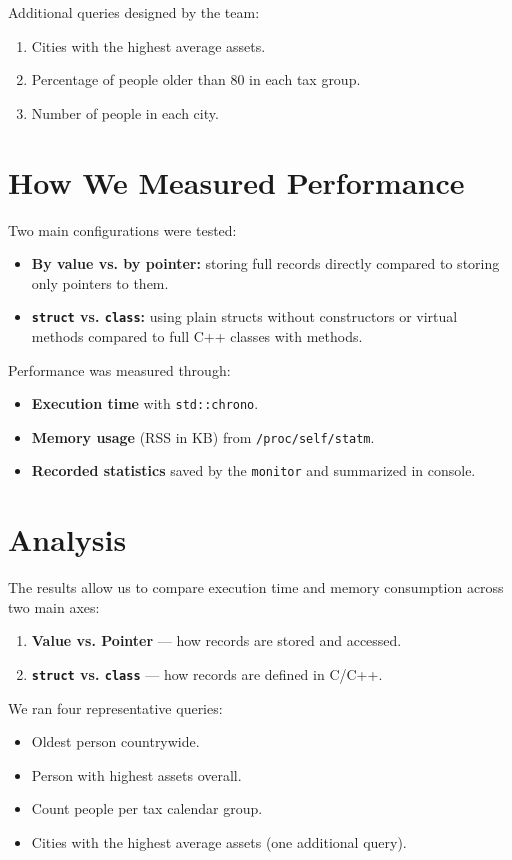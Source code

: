 \documentclass[11pt,letterpaper,oneside]{article}
\begin{document}
Additional queries designed by the team:
\begin{enumerate}
    \item Cities with the highest average assets.
    \item Percentage of people older than 80 in each tax group.
    \item Number of people in each city.
\end{enumerate}

\section{How We Measured Performance}

Two main configurations were tested:
\begin{itemize}
    \item \textbf{By value vs. by pointer:} storing full records directly
    compared to storing only pointers to them.
    \item \textbf{\texttt{struct} vs. \texttt{class}:} using plain structs
    without constructors or virtual methods compared to full C++ classes with
    methods.
\end{itemize}

Performance was measured through:
\begin{itemize}
    \item \textbf{Execution time} with \texttt{std::chrono}.
    \item \textbf{Memory usage} (RSS in KB) from \texttt{/proc/self/statm}.
    \item \textbf{Recorded statistics} saved by the \texttt{monitor} and
    summarized in console.
\end{itemize}

\section{Analysis}

The results allow us to compare execution time and memory consumption across two
main axes:
\begin{enumerate}
    \item \textbf{Value vs. Pointer} --- how records are stored and accessed.
    \item \textbf{\texttt{struct} vs. \texttt{class}} --- how records are
    defined in C/C++.
\end{enumerate}

We ran four representative queries:
\begin{itemize}
    \item Oldest person countrywide.
    \item Person with highest assets overall.
    \item Count people per tax calendar group.
    \item Cities with the highest average assets (one additional query).
\end{itemize}
\end{document}
